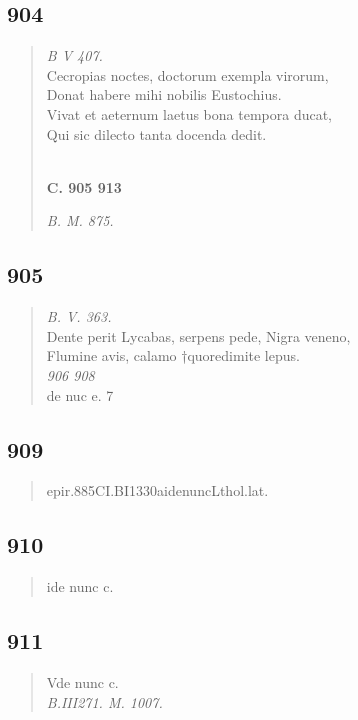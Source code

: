 \documentclass[11pt, a4paper]{report}
\begin{document}
            \subsection*{904}
      \begin{verse}
      \textit{B V 407.} \\ Cecropias noctes, doctorum exempla virorum, \\ Donat habere mihi nobilis Eustochius. \\ Vivat et aeternum laetus bona tempora ducat, \\ Qui sic dilecto tanta docenda dedit. \\ 
        ﻿\pagebreak 
     \marginpar{[342]} \begin{center} \textbf{C. 905 913} \end{center}\textit{B. M. 875.} \\ 
      \end{verse}
  
            \subsection*{905}
      \begin{verse}
      \textit{B. V. 363.} \\ Dente perit Lycabas, serpens pede, Nigra veneno, \\ Flumine avis, calamo †quoredimite lepus. \\ \textit{906 908} \\ de nuc e. 7 \\ 
      \end{verse}
  
            \subsection*{909}
      \begin{verse}
      epir.885CI.BI1330aidenuncLthol.lat. \\ 
      \end{verse}
  
            \subsection*{910}
      \begin{verse}
      ide nunc c. \\ 
      \end{verse}
  
            \subsection*{911}
      \begin{verse}
      Vde nunc c. \\ \textit{B.III271. M. 1007.} \\ 
      \end{verse}
  
\end{document}
